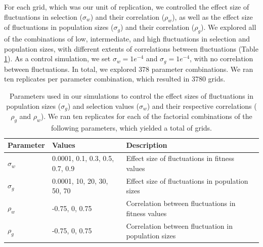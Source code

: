 \begin{refsection}
For each grid, which was our unit of replication, we controlled the effect size of  fluctuations in selection ($\sigma_{w}$) and their correlation ($\rho_{w}$), as well as the effect size of fluctuations in population sizes ($\sigma_{g}$) and their correlation ($\rho_{g}$). We explored all of  the combinations of low, intermediate, and high fluctuations in selection and population sizes, with different extents of correlations between fluctuations (Table \ref{tab:fluctuations}).  As a control simulation, we set $\sigma_{w}=1e^{-4}$ and  $\sigma_{g}=1e^{-4}$, with no correlation between fluctuations. In total, we explored 378 parameter combinations. We ran ten replicates per parameter combination, which resulted in 3780 grids.


\begin{table}[h]
\fontsize{7}{10}\selectfont
\centering
\caption[Parameters used in our simulations to control the effect sizes of fluctuations in population sizes ($\sigma_{g}$) and selection values ($\sigma_{w}$) and their respective correlations ($\rho_{g}$ and $\rho_{w}$)]{Parameters used in our simulations to control the effect sizes of fluctuations in population sizes ($\sigma_{g}$) and selection values ($\sigma_{w}$) and their respective correlations ($\rho_{g}$ and $\rho_{w}$). We ran ten replicates for each of the factorial combinations of the following parameters, which yielded a total of grids. }
\begin{tabular}{@{}llll@{}}
\toprule
Parameter                    & Values                    & Description                                   &  \\ \midrule
$\sigma_{w}$ & 0.0001, 0.1, 0.3, 0.5, 0.7, 0.9 & Effect size of fluctuations in fitness values &  \\
$\sigma_{g}$ & 0.0001, 10, 20, 30, 50, 70 & Effect size of fluctuations in population sizes                                              &  \\
$\rho_{w}$  &  -0.75, 0, 0.75                         &   Correlation between fluctuations in fitness values                                            &  \\
$\rho_{g}$  &   -0.75, 0, 0.75                        &  Correlation between fluctuation in population sizes                                             &  \\ \bottomrule
\end{tabular}
\label{tab:fluctuations}
\end{table}

\end{refsection}
